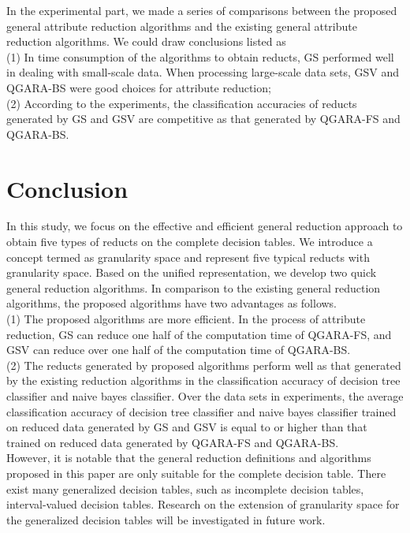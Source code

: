 \documentclass[review]{elsarticle}
\begin{document}
	\par In the experimental part, we made a series of comparisons between the  proposed general attribute reduction algorithms and the existing general attribute reduction algorithms. We could draw conclusions listed as
	\\{\rm(1)} In time consumption of the algorithms to obtain reducts, GS performed well in dealing with small-scale data. When processing large-scale data sets, GSV and QGARA-BS were good choices for attribute reduction;
	\\{\rm(2)} According to the experiments, the classification accuracies of reducts generated by GS and GSV are competitive as that generated by QGARA-FS and QGARA-BS.
		
\section{Conclusion}
	\par In this study, we focus on the effective and efficient general reduction approach to obtain five types of reducts on the complete decision tables. We introduce a concept termed as granularity space and represent five typical reducts with granularity space. Based on the unified representation, we develop two quick general reduction algorithms. In comparison to the existing general reduction algorithms, the proposed algorithms have two advantages as follows.
	\\(1) The proposed algorithms are more efficient. In the process of attribute reduction, GS can reduce one half of the computation time of QGARA-FS, and GSV can reduce over one half of the computation time of QGARA-BS.
	\\(2) The reducts generated by proposed algorithms perform well as that generated by the existing reduction algorithms in the classification accuracy of decision tree classifier and naive bayes classifier. Over the data sets in experiments, the average classification accuracy of decision tree classifier and naive bayes classifier trained on reduced data generated by GS and GSV is equal to or higher than that trained on reduced data generated by QGARA-FS and QGARA-BS.
	\\\indent However, it is notable that the general reduction definitions and algorithms proposed in this paper are only suitable for the complete decision table. There exist many generalized decision tables, such as incomplete decision tables, interval-valued decision tables. Research on the extension of granularity space for the generalized decision tables will be investigated in future work.  
\end{document}
